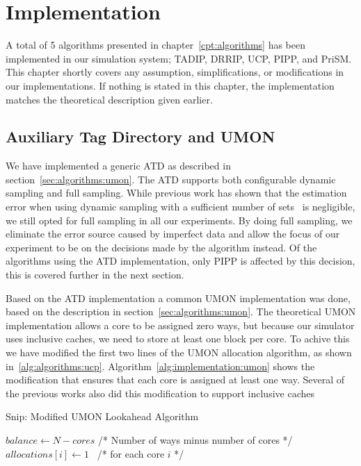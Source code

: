 \chapter{Implementation}
\label{cpt:implementation}

A total of 5 algorithms presented in chapter~\ref{cpt:algorithms} has been implemented in our simulation system; TADIP, DRRIP, UCP, PIPP, and PriSM.
This chapter shortly covers any assumption, simplifications, or modifications in our implementations.
If nothing is stated in this chapter, the implementation matches the theoretical description given earlier.


\section{Auxiliary Tag Directory and UMON}

We have implemented a generic ATD as described in section~\ref{sec:algorithms:umon}.
The ATD supports both configurable dynamic sampling and full sampling.
While previous work has shown that the estimation error when using dynamic sampling with a sufficient number of sets~\cite{} is negligible, we still opted for full sampling in all our experiments.
By doing full sampling, we eliminate the error source caused by imperfect data and allow the focus of our experiment to be on the decisions made by the algorithm instead.
Of the algorithms using the ATD implementation, only PIPP is affected by this decision, this is covered further in the next section.

Based on the ATD implementation a common UMON implementation was done, based on the description in section~\ref{sec:algorithms:umon}.
The theoretical UMON implementation allows a core to be assigned zero ways, but because our simulator uses inclusive caches, we need to store at least one block per core.
To achive this we have modified the first two lines of the UMON allocation algorithm, as shown in~\ref{alg:algorithms:ucp}.
Algorithm~\ref{alg:implementation:umon} shows the modification that ensures that each core is assigned at least one way.
Several of the previous works also did this modification to support inclusive caches~\cite{Qureshi2006,Xie2009}

\begin{algorithm}[ht]
\caption{Snip: Modified UMON Lookahead Algorithm}
\label{alg:implementation:ucp}
\begin{algorithmic}[1]
\State $balance\gets N - cores $ /* Number of ways minus number of cores */
\State $allocations[i]\gets 1$  /* for each core $i$ */
\end{algorithmic}
\end{algorithm}

